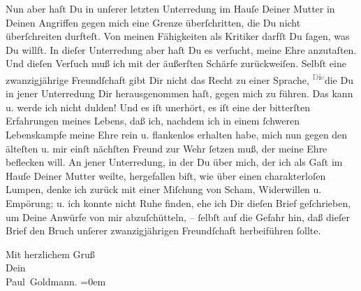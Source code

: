 \pstart
           Nun aber haſt Du in unſerer letzten Unterredung im Hauſe Deiner Mutter in Deinen Angriffen gegen mich eine Grenze
               überſchritten, die Du {\pb}nicht überſchreiten
               durfteſt. Von meinen Fähigkeiten als Kritiker darfſt Du{ }ſagen, was Du willſt. In
               dieſer Unterredung aber haſt Du es verſucht, meine Ehre anzutaſten. Und dieſen
               Verſuch muß ich mit der äußerſten Schärfe zurückweiſen.  Selbſt eine zwanzigjährige Freundſchaft gibt
               Dir nicht das Recht zu einer Sprache, \substVorne{}\textsuperscript{\textcolor{gray}{D}i\textcolor{gray}{e}}\substDazwischen{}die\substHinten{} Du in jener Unterredung Dir herausgenommen haſt, gegen mich zu führen. Das
               kann u. werde ich nicht {\pb}dulden! Und es iſt  unerhört, es iſt eine der bitterſten Erfahrungen
               meines Lebens, daß ich, nachdem ich in einem{ }ſchweren Lebenskampfe meine Ehre rein u.
               flankenlos erhalten habe, mich nun gegen den älteſten u. mir einſt nächſten Freund
               zur Wehr{ }ſetzen  muß, der meine Ehre \strikeout{\textcolor{gray}{bef}} beflecken will. An jener Unterredung, in der  Du über mich, der ich als Gaſt im Hauſe Deiner Mutter weilte, {\pb}\strikeout{\textcolor{gray}{×}\-\textcolor{gray}{×}\-\textcolor{gray}{×}\-\textcolor{gray}{×}\-\textcolor{gray}{×}\-\textcolor{gray}{×}} hergefallen biſt, wie über einen charakterloſen Lumpen, denke ich zurück mit
               einer Miſchung von Scham, Widerwillen u. Empörung; u. ich konnte nicht Ruhe finden,
               ehe ich Dir dieſen Brief geſchrieben, um Deine Anwürfe von mir abzuſchütteln, –{ }ſelbſt auf die Gefahr hin, daß dieſer Brief den Bruch unſerer zwanzigjährigen
               Freundſchaft herbeiführen{ }ſollte.\pend
           
\pstart
           {\pb}Mit herzlichem Gruß {\\[\baselineskip]}Dein {\\[\baselineskip]}\spacefill\mbox{Paul Goldmann.}\pend
           \leftskip=0em{}\endnumbering{}  \newcommand{\dateiname}{L03475}\newcommand{\titel}{Paul Goldmann an Arthur Schnitzler, 13. 1. 1911}\newcommand{\editorInnen}{Martin Anton Müller und Laura Untner}
